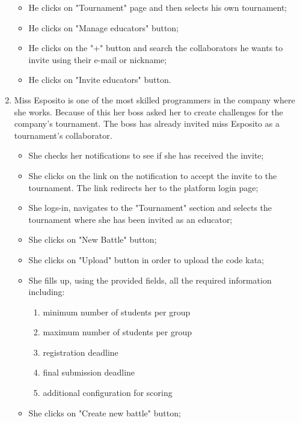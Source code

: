 \documentclass[../RASD.tex]{subfiles}
\begin{document}
\begin{enumerate}
{\begin{itemize}
{                At this point he can invite his collaborators;}
                \item {He clicks on "Tournament" page and then selects his own tournament;}
                \item {He clicks on "Manage educators" button;}
                \item {He clicks on the "+" button and search the collaborators he wants to invite using their e-mail or nickname;}
                \item {He clicks on "Invite educators" button.}
            \end{itemize}}
            \item {Miss Esposito is one of the most skilled programmers in the company where she works.
            Because of this her boss asked her to create challenges for the company's tournament.
            The boss has already invited miss Esposito as a tournament's collaborator.
            \begin{itemize}
                \item {She checks her notifications to see if she has received the invite;}
                \item {She clicks on the link on the notification to accept the invite to the tournament.
                The link redirects her to the platform login page;}
                \item {She logs-in, navigates to the "Tournament" section and selects the tournament where she has been invited as an educator;}
                \item {She clicks on "New Battle" button;}
                \item {She clicks on "Upload" button in order to upload the code kata;}
                \item {She fills up, using the provided fields, all the required information including:
                \begin{enumerate}
                    \item {minimum number of students per group}
                    \item {maximum  number of students per group}
                    \item {registration deadline}
                    \item {final submission deadline}
                    \item {additional configuration for scoring}
                \end{enumerate}}
                \item {She clicks on "Create new battle" button;}

\end{itemize}}
\end{enumerate}
\end{document}
